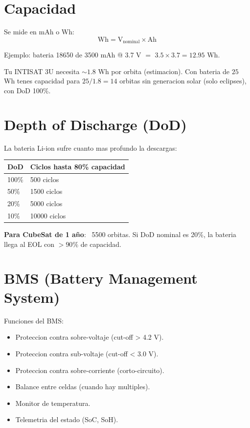 \documentclass[11pt,a4paper,oneside,openright]{book}
\begin{document}
\section{Capacidad}

Se mide en mAh o Wh:
\[
\text{Wh} = \text{V}_{\text{nominal}} \times \text{Ah}
\]

Ejemplo: bateria 18650 de 3500 mAh @ 3.7 V $=$ $3.5 \times 3.7 = 12.95$ Wh.

\begin{calculo}
Tu INTISAT 3U necesita $\sim 1.8$ Wh por orbita (estimacion).
Con bateria de $25$ Wh tenes capacidad para $25/1.8 = 14$ orbitas
sin generacion solar (solo eclipses), con DoD 100\%.
\end{calculo}

\section{Depth of Discharge (DoD)}

La bateria Li-ion sufre cuanto mas profundo la descargas:

\begin{center}
\begin{tabular}{ll}
\toprule
\textbf{DoD} & \textbf{Ciclos hasta 80\% capacidad} \\
\midrule
100\% & 500 ciclos \\
50\%  & 1500 ciclos \\
20\%  & 5000 ciclos \\
10\%  & 10000 ciclos \\
\bottomrule
\end{tabular}
\end{center}

\textbf{Para CubeSat de 1 año}: ~5500 orbitas. Si DoD nominal es 20\%,
la bateria llega al EOL con $> 90\%$ de capacidad.

\section{BMS (Battery Management System)}

Funciones del BMS:
\begin{itemize}[leftmargin=2em]
  \item Proteccion contra sobre-voltaje (cut-off > 4.2 V).
  \item Proteccion contra sub-voltaje (cut-off < 3.0 V).
  \item Proteccion contra sobre-corriente (corto-circuito).
  \item Balance entre celdas (cuando hay multiples).
  \item Monitor de temperatura.
  \item Telemetria del estado (SoC, SoH).
\end{itemize}
\end{document}
